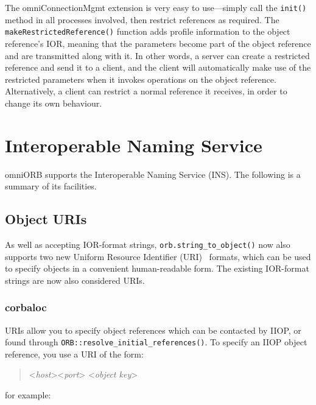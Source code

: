 \documentclass[11pt,oneside,a4paper]{book}
\newcommand{\op}[1]{\texttt{#1()}}
\begin{document}
The omniConnectionMgmt extension is very easy to use---simply call the
\op{init} method in all processes involved, then restrict references
as required. The \op{makeRestrictedReference} function adds profile
information to the object reference's IOR, meaning that the parameters
become part of the object reference and are transmitted along with
it. In other words, a server can create a restricted reference and
send it to a client, and the client will automatically make use of the
restricted parameters when it invokes operations on the object
reference. Alternatively, a client can restrict a normal reference it
receives, in order to change its own behaviour.



\chapter{Interoperable Naming Service}
\label{chap:ins}

omniORB supports the Interoperable Naming Service (INS). The following
is a summary of its facilities.


\section{Object URIs}

As well as accepting IOR-format strings, \op{orb.string\_to\_object}
now also supports two new Uniform Resource Identifier
(URI)~\cite{rfc2396} formats, which can be used to specify objects in
a convenient human-readable form. The existing IOR-format strings are
now also considered URIs.

\subsection{corbaloc}

 URIs allow you to specify object references which
can be contacted by IIOP, or found through
\op{ORB::resolve\_initial\_references}. To specify an IIOP object
reference, you use a URI of the form:

\begin{quote}
<\textit{host}>\corbauri{:}<\textit{port}>%
\corbauri{/}<\textit{object key}>
\end{quote}

\noindent for example:
\end{document}
